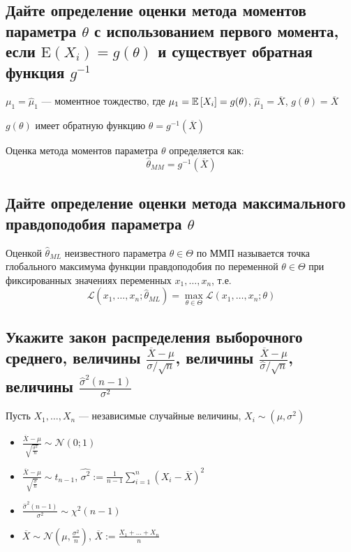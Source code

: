 \documentclass{article}
\begin{document}
\subsection{Дайте определение оценки метода моментов параметра $\theta$ с использованием первого момента, если $\mathrm{E}\left(X_{i}\right)=g(\theta)$ и существует обратная функция $g^{-1}$}
$\mu_1=\widehat{\mu}_1$ — моментное тождество, где $\mu_1=\mathbb{E}\left[X_i\right]=g(\theta)$, $\widehat{\mu}_1=\overline{X}$, $g(\theta)=\overline{X}$

$g(\theta)$ имеет обратную функцию $\theta=g^{-1}(\overline{X})$

 Оценка метода моментов параметра $\theta$ определяется как:
\begin{equation*}
    \hat{\theta}_{MM} = g^{-1}\left( \overline{X} \right)
\end{equation*}

\subsection{Дайте определение оценки метода максимального правдоподобия параметра $\theta$}
 Оценкой $\hat{\theta}_{ML}$ неизвестного параметра $\theta \in \Theta$ по ММП называется точка глобального максимума функции правдоподобия по переменной $\theta \in \Theta$ при фиксированных значениях переменных $x_{1}, \ldots, x_{n}$, т.е.
\begin{equation*}
    \mathcal{L}\left(x_{1}, \ldots, x_{n} ; \hat{\theta}_{ML}\right)=\max _{\theta \in \Theta} \mathcal{L}\left(x_{1}, \ldots, x_{n} ; \theta\right)
\end{equation*}

\subsection{Укажите закон распределения выборочного среднего, величины $\frac{\overline{X}-\mu}{\sigma / \sqrt{n}}$, величины $\frac{\overline{X}-\mu}{\hat{\sigma} / \sqrt{n}}$, величины $\frac{\hat{\sigma}^{2}(n-1)}{\sigma^{2}}$}
Пусть $X_{1}, \ldots, X_{n}$ — независимые случайные величины, $X_i\sim(\mu,\sigma^2)$%
\begin{itemize}
    \item $\frac{\overline{X}-\mu}{\sqrt{\frac{\sigma^2}{n}}}\sim\mathcal{N}(0;1)$
    \item $\frac{\overline{X}-\mu}{\sqrt{\frac{\hat{\sigma}}{n}}}\sim t_{n-1}$, $\widehat{\sigma^{2}}:=\frac{1}{n-1} \sum_{i=1}^{n}\left(X_{i}-\overline{X}\right)^{2}$
    \item $\frac{\hat{\sigma}^{2}(n-1)}{\sigma^{2}} \sim \chi^{2}(n-1)$
    \item $\overline{X} \sim \mathcal{N}\left(\mu, \frac{\sigma^2}{n} \right)$, $\overline{X}:=\frac{X_{1}+\ldots+X_{n}}{n}$
\end{itemize}
\end{document}
